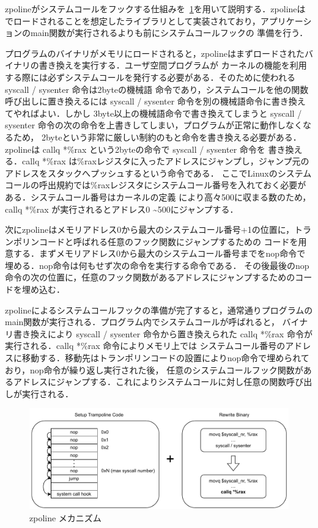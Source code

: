 \documentclass[a4paper，11pt]{jreport}
\begin{document}
zpolineがシステムコールをフックする仕組みを\figurename~\ref{fig:Zpoline mechanism}を用いて説明する．zpolineは
でロードされることを想定したライブラリとして実装されており，アプリケーションのmain関数が実行されるよりも前にシステムコールフックの
準備を行う．

プログラムのバイナリがメモリにロードされると，zpolineはまずロードされたバイナリの書き換えを実行する．ユーザ空間プログラムが
カーネルの機能を利用する際には必ずシステムコールを発行する必要がある．そのために使われる syscall / sysenter 命令は2byteの機械語
命令であり，システムコールを他の関数呼び出しに置き換えるには syscall / sysenter 命令を別の機械語命令に書き換えてやればよい．しかし
3byte以上の機械語命令で書き換えてしまうと syscall / sysenter 命令の次の命令を上書きしてしまい，プログラムが正常に動作しなくなるため，
2byteという非常に厳しい制約のもと命令を書き換える必要がある．zpolineは callq *\%rax という2byteの命令で syscall / sysenter 命令を
書き換える．callq *\%rax は\%raxレジスタに入ったアドレスにジャンプし，ジャンプ元のアドレスをスタックへプッシュするという命令である．
ここでLinuxのシステムコールの呼出規約では\%raxレジスタにシステムコール番号を入れておく必要がある．システムコール番号はカーネルの定義
により高々500に収まる数のため，callq *\%rax が実行されるとアドレス0 \textasciitilde 500にジャンプする．

次にzpolineはメモリアドレス0から最大のシステムコール番号+1の位置に，トランポリンコードと呼ばれる任意のフック関数にジャンプするための
コードを用意する．まずメモリアドレス0から最大のシステムコール番号までをnop命令で埋める．nop命令は何もせず次の命令を実行する命令である．
その後最後のnop命令の次の位置に，任意のフック関数があるアドレスにジャンプするためのコードを埋め込む．

zpolineによるシステムコールフックの準備が完了すると，通常通りプログラムのmain関数が実行される．プログラム内でシステムコールが呼ばれると，
バイナリ書き換えにより syscall / sysenter 命令から置き換えられた callq *\%rax 命令が実行される．callq *\%rax 命令によりメモリ上では
システムコール番号のアドレスに移動する．移動先はトランポリンコードの設置によりnop命令で埋められており，nop命令が繰り返し実行された後，
任意のシステムコールフック関数があるアドレスにジャンプする．これによりシステムコールに対し任意の関数呼び出しが実行される．


\begin{figure}[h]
	\begin{minipage}[b]{1\columnwidth}
		\centering
		\includegraphics[width=0.9\linewidth]{./figure/zpoline_mechanism.pdf}
		\caption{zpoline メカニズム}
		\label{fig:Zpoline mechanism}
	\end{minipage}
\end{figure}
\end{document}
